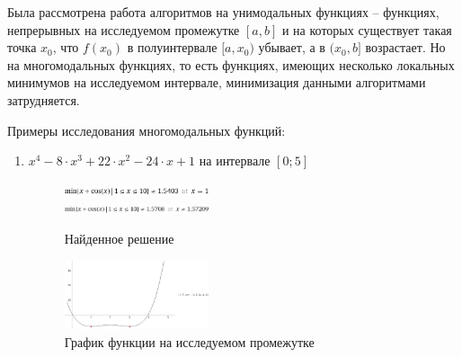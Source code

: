 \documentclass[12pt]{article}
\begin{document}
Была рассмотрена работа алгоритмов на унимодальных функциях -- функциях, непрерывных на исследуемом промежутке $[a, b]$ и на которых существует такая точка $x_0$, что $f(x_0)$ в полуинтервале $[a, x_0)$ убывает, а в $(x_0, b]$ возрастает. Но на многомодальных функциях, то есть функциях, имеющих несколько локальных минимумов на исследуемом интервале, минимизация данными алгоритмами затрудняется.

Примеры исследования многомодальных функций:

\begin{enumerate}
\item $x^4 - 8 \cdot x^3 + 22 \cdot x^2 - 24 \cdot x + 1$ на интервале $[0; 5]$ 

\begin{figure}[h]
\centering
\includegraphics[width=0.4\textwidth]{images/2loc1.jpg} \\
\includegraphics[width=0.4\textwidth]{images/2loc2.jpg}
\caption{Найденное решение}
\end{figure}

\begin{figure}[h]
\centering
\includegraphics[width=0.4\textwidth]{images/1loc3.jpg}
\caption{График функции на исследуемом промежутке}
\end{figure}


\end{enumerate}
\end{document}
